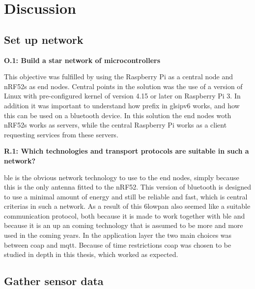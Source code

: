 \chapter{Discussion}
\label{chp:dataAnalysis}


\section{Set up network}

\noindent \textbf{O.1: Build a star network of microcontrollers}

This objective was fulfilled by using the Raspberry Pi as a central node and nRF52s as end nodes. Central points in the solution was the use of a version of Linux with pre-configured kernel of version 4.15 or later on Raspberry Pi 3. In addition it was important to understand how prefix in gls{ipv6} works, and how this can be used on a bluetooth device. In this solution the end nodes woth \glspl{nRF52} works as servers, while the central Raspberry Pi works as a client requesting services from these servers. 


\noindent \textbf{R.1: Which technologies and transport protocols are suitable in such a network?}

\gls{ble} is the obvious network technology to use to the end nodes, simply because this is the only antenna fitted to the nRF52. This version of bluetooth is designed to use a minimal amount of energy and still be reliable and fast, which is central criterias in such a network. As a result of this \gls{6lowpan} also seemed like a suitable communication protocol, both because it is made to work together with \gls{ble} and because it is an up an coming technology that is assumed to be more and more used in the coming years. In the application layer the two main choices was between \gls{coap} and \gls{mqtt}. Because of time restrictions \gls{coap} was chosen to be studied in depth in this thesis, which worked as expected. 

\newpage


\section{Gather sensor data}

